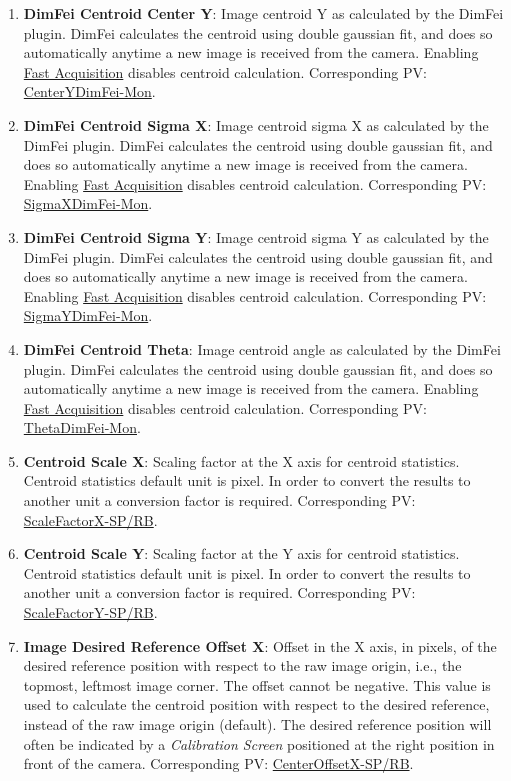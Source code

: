 \documentclass[openany]{article}
\begin{document}
\begin{enumerate}
            \item \textbf{DimFei Centroid Center Y}: Image centroid Y as calculated by the DimFei plugin. DimFei calculates the centroid using double gaussian fit, and does so automatically anytime a new image is received from the camera. Enabling \hyperref[seq:fast-acq]{Fast Acquisition} disables centroid calculation. Corresponding PV: \hyperlink{pv:center-y-dimfei}{CenterYDimFei-Mon}.
            \item \textbf{DimFei Centroid Sigma X}: Image centroid sigma X as calculated by the DimFei plugin. DimFei calculates the centroid using double gaussian fit, and does so automatically anytime a new image is received from the camera. Enabling \hyperref[seq:fast-acq]{Fast Acquisition} disables centroid calculation. Corresponding PV: \hyperlink{pv:sigma-x-dimfei}{SigmaXDimFei-Mon}.
            \item \textbf{DimFei Centroid Sigma Y}: Image centroid sigma Y as calculated by the DimFei plugin. DimFei calculates the centroid using double gaussian fit, and does so automatically anytime a new image is received from the camera. Enabling \hyperref[seq:fast-acq]{Fast Acquisition} disables centroid calculation. Corresponding PV: \hyperlink{pv:sigma-y-dimfei}{SigmaYDimFei-Mon}.
            \item \textbf{DimFei Centroid Theta}: Image centroid angle as calculated by the DimFei plugin. DimFei calculates the centroid using double gaussian fit, and does so automatically anytime a new image is received from the camera. Enabling \hyperref[seq:fast-acq]{Fast Acquisition} disables centroid calculation. Corresponding PV: \hyperlink{pv:theta-dimfei}{ThetaDimFei-Mon}.
            \item \textbf{Centroid Scale X}: Scaling factor at the X axis for centroid statistics. Centroid statistics default unit is pixel. In order to convert the results to another unit a conversion factor is required. Corresponding PV: \hyperlink{pv:scale-factor-x}{ScaleFactorX-SP/RB}.
            \item \textbf{Centroid Scale Y}: Scaling factor at the Y axis for centroid statistics. Centroid statistics default unit is pixel. In order to convert the results to another unit a conversion factor is required. Corresponding PV: \hyperlink{pv:scale-factor-y}{ScaleFactorY-SP/RB}.
            \item \textbf{Image Desired Reference Offset X}: Offset in the X axis, in pixels, of the desired reference position with respect to the raw image origin, i.e., the topmost, leftmost image corner. The offset cannot be negative. This value is used to calculate the centroid position with respect to the desired reference, instead of the raw image origin (default). The desired reference position will often be indicated by a \emph{Calibration Screen} positioned at the right position in front of the camera. Corresponding PV: \hyperlink{pv:center-offset-x}{CenterOffsetX-SP/RB}.

\end{enumerate}
\end{document}
